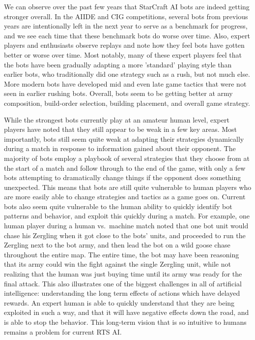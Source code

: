 We can observe over the past few years that StarCraft AI bots are indeed getting stronger overall. In the AIIDE and CIG competitions, several bots from previous years are intentionally left in the next year to serve as a benchmark for progress, and we see each time that these benchmark bots do worse over time. Also, expert players and enthusiasts observe replays and note how they feel bots have gotten better or worse over time. Most notably, many of these expert players feel that the bots have been gradually adapting a more 'standard' playing style than earlier bots, who traditionally did one strategy such as a rush, but not much else. More modern bots have developed mid and even late game tactics that were not seen in earlier rushing bots. Overall, bots seem to be getting better at army composition, build-order selection, building placement, and overall game strategy. 

While the strongest bots currently play at an amateur human level, expert players have noted that they still appear to be weak in a few key areas. Most importantly, bots still seem quite weak at adapting their strategies dynamically during a match in response to information gained about their opponent. The majority of bots employ a playbook of several strategies that they choose from at the start of a match and follow through to the end of the game, with only a few bots attempting to dramatically change things if the opponent does something unexpected. This means that bots are still quite vulnerable to human players who are more easily able to change strategies and tactics as a game goes on. Current bots also seem quite vulnerable to the human ability to quickly identify bot patterns and behavior, and exploit this quickly during a match. For example, one human player during a human vs.\ machine match noted that one bot unit would chase his Zergling when it got close to the bots' units, and proceeded to run the Zergling next to the bot army, and then lead the bot on a wild goose chase throughout the entire map. The entire time, the bot may have been reasoning that its army could win the fight against the single Zergling unit, while not realizing that the human was just buying time until its army was ready for the final attack. This also illustrates one of the biggest challenges in all of artificial intelligence: understanding the long term effects of actions which have delayed rewards. An expert human is able to quickly understand that they are being exploited in such a way, and that it will have negative effects down the road, and is able to stop the behavior. This long-term vision that is so intuitive to humans remains a problem for current RTS AI.



